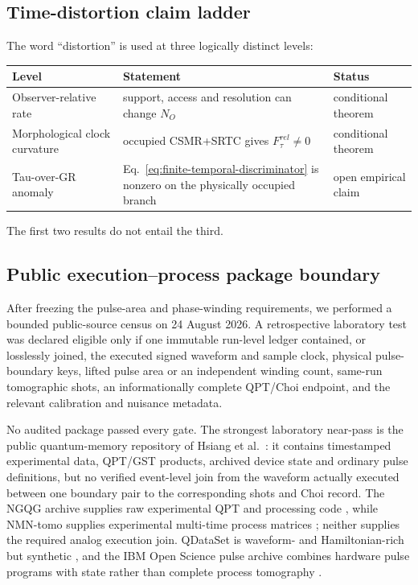 \documentclass[11pt]{article}
\begin{document}
\subsection{Time-distortion claim ladder}

The word ``distortion'' is used at three logically distinct levels:
\begin{center}
\begin{tabular}{L{.31\linewidth}L{.30\linewidth}L{.28\linewidth}}
\toprule
Level & Statement & Status\\
\midrule
Observer-relative rate & support, access and resolution can change \(N_O\) & conditional theorem\\
Morphological clock curvature & occupied CSMR+SRTC gives \(F_\tau^{rel}\ne0\) & conditional theorem\\
Tau-over-GR anomaly & Eq.~\eqref{eq:finite-temporal-discriminator} is nonzero on the physically occupied branch & open empirical claim\\
\bottomrule
\end{tabular}
\end{center}
The first two results do not entail the third.

\subsection{Public execution--process package boundary}

After freezing the pulse-area and phase-winding requirements, we performed a
bounded public-source census on 24 August 2026. A retrospective laboratory
test was declared eligible only if one immutable run-level ledger contained,
or losslessly joined, the executed signed waveform and sample clock, physical
pulse-boundary keys, lifted pulse area or an independent winding count,
same-run tomographic shots, an informationally complete QPT/Choi endpoint, and
the relevant calibration and nuisance metadata.

No audited package passed every gate. The strongest laboratory near-pass is
the public quantum-memory repository of Hsiang et al.\ \cite{HsiangQMemRepo}:
it contains timestamped experimental data, QPT/GST products, archived device
state and ordinary pulse definitions, but no verified event-level join from
the waveform actually executed between one boundary pair to the corresponding
shots and Choi record. The NGQG archive supplies raw experimental QPT and
processing code \cite{ZhangNGQGData}, while NMN-tomo supplies experimental
multi-time process matrices \cite{GiarmatziNMNRepo}; neither supplies the
required analog execution join. QDataSet is waveform- and Hamiltonian-rich
but synthetic \cite{PerrierQDataSetRepo}, and the IBM Open Science pulse
archive combines hardware pulse programs with state rather than complete
process tomography \cite{IBMOpenSciencePulse2021}.
\end{document}
